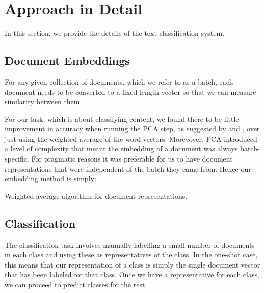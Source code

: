 \section{Approach in Detail} \label{approach}
In this section, we provide the details of the text classification system.

\subsection{Document Embeddings}
 For any given collection of documents, which we refer to as a batch, each document needs to be converted to a fixed-length vector so that we can measure similarity between them. 

For our task, which is about classifying content, we found there to be little improvement in accuracy when running the PCA step, as suggested by  and , over just using the weighted average of the word vectors. Morevover, PCA introduced a level of complexity that meant the embedding of a document was always batch-specific. For pragmatic reasons it was preferable for us to have document representations that were independent of the batch they came from. Hence our embedding method is simply:

\begin{algorithm}[!h]

\caption{Weighted average algorithm for document representations.}
\label{algo:representation}
\end{algorithm}

\subsection{Classification}
The classification task involves manually labelling a small number of documents in each class and using these as representatives of the class. In the one-shot case, this means that our representation of a class is simply the single document vector that has been labeled for that class. Once we have a representative for each class, we can proceed to predict classes for the rest.

